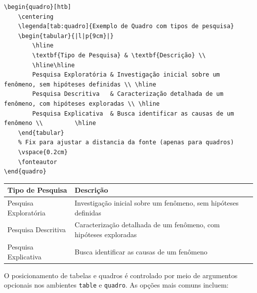 \begin{codigo}[htb]
\begin{lstlisting}
\begin{quadro}[htb]
    \centering
    \legenda[tab:quadro]{Exemplo de Quadro com tipos de pesquisa}
    \begin{tabular}{|l|p{9cm}|}
        \hline
        \textbf{Tipo de Pesquisa} & \textbf{Descrição} \\
        \hline\hline
        Pesquisa Exploratória & Investigação inicial sobre um fenômeno, sem hipóteses definidas \\ \hline
        Pesquisa Descritiva   & Caracterização detalhada de um fenômeno, com hipóteses exploradas \\ \hline
        Pesquisa Explicativa  & Busca identificar as causas de um fenômeno \\         \hline
    \end{tabular}
    % Fix para ajustar a distancia da fonte (apenas para quadros)
    \vspace{0.2cm}
    \fonteautor
\end{quadro}
\end{lstlisting}
\fonteautor
\end{codigo}

\begin{quadro}[htb]
    \centering
    \begin{tabular}{|l|p{9cm}|}
        \hline
        \textbf{Tipo de Pesquisa} & \textbf{Descrição} \\
        \hline\hline
        Pesquisa Exploratória & Investigação inicial sobre um fenômeno, sem hipóteses definidas \\ \hline
        Pesquisa Descritiva   & Caracterização detalhada de um fenômeno, com hipóteses exploradas \\ \hline
        Pesquisa Explicativa  & Busca identificar as causas de um fenômeno \\ \hline
    \end{tabular}
    \vspace{0.2cm} %
    \fonteautor
\end{quadro}

O posicionamento de tabelas e quadros é controlado por meio de argumentos opcionais nos ambientes \texttt{table} e \texttt{quadro}. As opções mais comuns incluem:

